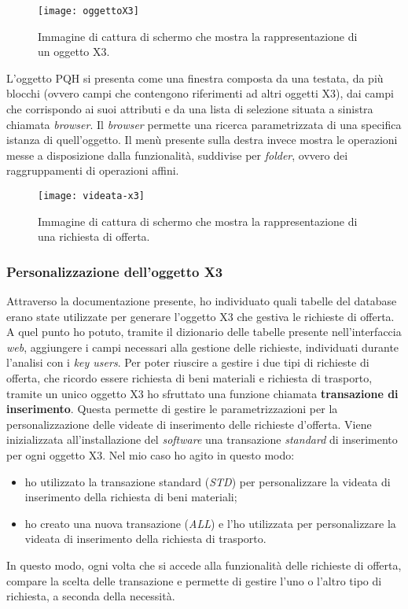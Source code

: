 \begin{figure}[htbp]
	\begin{center}
		\texttt{[image: oggettoX3]}
		\caption{Immagine di cattura di schermo che mostra la rappresentazione di un oggetto X3.}
	\end{center}
\end{figure}


L'oggetto PQH si presenta come una finestra composta da una testata, da più blocchi (ovvero campi che contengono riferimenti ad altri oggetti X3), dai campi che corrispondo ai suoi attributi e da una lista di selezione situata a sinistra chiamata \textit{browser}. Il \textit{browser} permette una ricerca parametrizzata di una specifica istanza di quell'oggetto. Il menù presente sulla destra invece mostra le operazioni messe a disposizione dalla funzionalità, suddivise per \textit{folder}, ovvero dei raggruppamenti di operazioni affini.

\begin{figure}[htbp]
	\begin{center}
		\texttt{[image: videata-x3]}
		\caption{Immagine di cattura di schermo che mostra la rappresentazione di una richiesta di offerta.}
	\end{center}
\end{figure}


\subsubsection{Personalizzazione dell'oggetto X3}
Attraverso la documentazione presente, ho individuato quali tabelle del database erano state utilizzate per generare l'oggetto X3 che gestiva le richieste di offerta.
A quel punto ho potuto, tramite il dizionario delle tabelle presente nell'interfaccia \textit{web}, aggiungere i campi necessari alla gestione delle richieste, individuati durante l'analisi con i \textit{key users}.
Per poter riuscire a gestire i due tipi di richieste di offerta, che ricordo essere richiesta di beni materiali e richiesta di trasporto, tramite un unico oggetto X3 ho sfruttato una funzione chiamata \textbf{transazione di inserimento}.
Questa permette di gestire le parametrizzazioni per la personalizzazione delle videate di inserimento delle richieste d'offerta.
Viene inizializzata all'installazione del \textit{software} una transazione \textit{standard} di inserimento per ogni oggetto X3. 
Nel mio caso ho agito in questo modo:
\begin{itemize}
	\item ho utilizzato la transazione standard (\textit{STD}) per personalizzare la videata di inserimento della richiesta di beni materiali;
	\item ho creato una nuova transazione (\textit{ALL}) e l'ho utilizzata per personalizzare la videata di inserimento della richiesta di trasporto.
\end{itemize}
In questo modo, ogni volta che si accede alla funzionalità delle richieste di offerta, compare la scelta delle transazione e permette di gestire l'uno o l'altro tipo di richiesta, a seconda della necessità.

